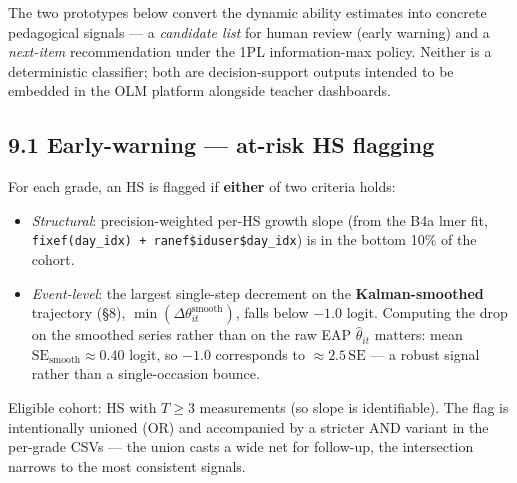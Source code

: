 \documentclass[
]{article}
\providecommand{\tightlist}{%
  \setlength{\itemsep}{0pt}\setlength{\parskip}{0pt}}
\begin{document}
The two prototypes below convert the dynamic ability estimates into
concrete pedagogical signals --- a \emph{candidate list} for human
review (early warning) and a \emph{next-item} recommendation under the
1PL information-max policy. Neither is a deterministic classifier; both
are decision-support outputs intended to be embedded in the OLM platform
alongside teacher dashboards.

\hypertarget{early-warning-at-risk-hs-flagging}{%
\subsection{9.1 Early-warning --- at-risk HS
flagging}\label{early-warning-at-risk-hs-flagging}}

For each grade, an HS is flagged if \textbf{either} of two criteria
holds:

\begin{itemize}
\tightlist
\item
  \emph{Structural}: precision-weighted per-HS growth slope (from the
  B4a lmer fit, \texttt{fixef(day\_idx)\ +\ ranef\$iduser\$day\_idx}) is
  in the bottom 10\% of the cohort.
\item
  \emph{Event-level}: the largest single-step decrement on the
  \textbf{Kalman-smoothed} trajectory (§8),
  \(\min(\Delta\theta^{\text{smooth}}_{it})\), falls below \(-1.0\)
  logit. Computing the drop on the smoothed series rather than on the
  raw EAP \(\hat\theta_{it}\) matters: mean
  \(\mathrm{SE}_{\text{smooth}} \approx 0.40\) logit, so \(-1.0\)
  corresponds to \(\approx 2.5\,\mathrm{SE}\) --- a robust signal rather
  than a single-occasion bounce.
\end{itemize}

Eligible cohort: HS with \(T \geq 3\) measurements (so slope is
identifiable). The flag is intentionally unioned (OR) and accompanied by
a stricter AND variant in the per-grade CSVs --- the union casts a wide
net for follow-up, the intersection narrows to the most consistent
signals.
\end{document}
